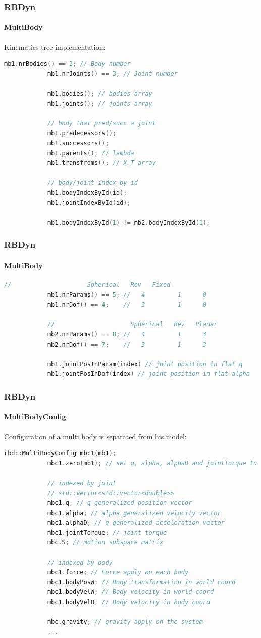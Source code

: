 \documentclass{beamer}
\begin{document}
	\begin{frame}[fragile]
		\frametitle{RBDyn}
		\framesubtitle{MultiBody}
		Kinematics tree implementation:
		\begin{lstlisting}[language=C++]
			mb1.nrBodies() == 3; // Body number
			mb1.nrJoints() == 3; // Joint number

			mb1.bodies(); // bodies array
			mb1.joints(); // joints array

			// body that pred/succ a joint
			mb1.predecessors();
			mb1.successors();
			mb1.parents(); // lambda
			mb1.transfroms(); // X_T array

			// body/joint index by id
			mb1.bodyIndexById(id);
			mb1.jointIndexById(id);

			mb1.bodyIndexById(1) != mb2.bodyIndexById(1);
		\end{lstlisting}
	\end{frame}
	\begin{frame}[fragile]
		\frametitle{RBDyn}
		\framesubtitle{MultiBody}
		\begin{lstlisting}[language=C++]
			//                     Spherical   Rev   Fixed
			mb1.nrParams() == 5; //   4         1      0
			mb1.nrDof() == 4;    //   3         1      0

			//                     Spherical   Rev   Planar
			mb2.nrParams() == 8; //   4         1      3
			mb2.nrDof() == 7;    //   3         1      3

			mb1.jointPosInParam(index) // joint position in flat q
			mb1.jointPosInDof(index) // joint position in flat alpha
		\end{lstlisting}
	\end{frame}

	\begin{frame}[fragile]
		\frametitle{RBDyn}
		\framesubtitle{MultiBodyConfig}
		Configuration of a multi body is separated from his model:
		\begin{lstlisting}[language=C++]
			rbd::MultiBodyConfig mbc1(mb1);
			mbc1.zero(mb1); // set q, alpha, alphaD and jointTorque to 0

			// indexed by joint
			// std::vector<std::vector<double>>
			mbc1.q; // q generalized position vector
			mbc1.alpha; // alpha generalized velocity vector
			mbc1.alphaD; // q generalized acceleration vector
			mbc1.jointTorque; // joint torque
			mbc.S; // motion subspace matrix

			// indexed by body
			mbc1.force; // Force apply on each body
			mbc1.bodyPosW; // Body transformation in world coord
			mbc1.bodyVelW; // Body velocity in world coord
			mbc1.bodyVelB; // Body velocity in body coord

			mbc.gravity; // gravity apply on the system
			...
		\end{lstlisting}
	\end{frame}
\end{document}
